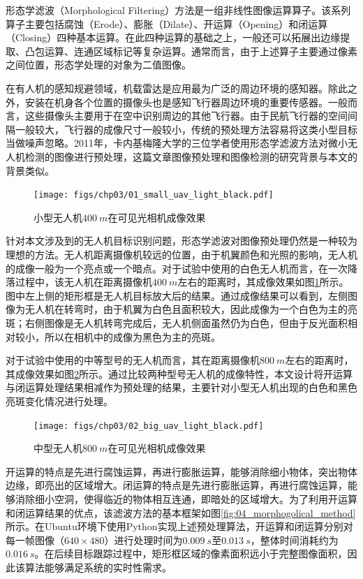形态学滤波（Morphological Filtering）方法是一组非线性图像运算算子。该系列算子主要包括腐蚀（Erode）、膨胀（Dilate）、开运算（Opening）和闭运算（Closing）四种基本运算。在此四种运算的基础之上，一般还可以拓展出边缘提取、凸包运算、连通区域标记等复杂运算。通常而言，由于上述算子主要通过像素之间位置，形态学处理的对象为二值图像。

在有人机的感知规避领域，机载雷达是应用最为广泛的周边环境的感知器。除此之外，安装在机身各个位置的摄像头也是感知飞行器周边环境的重要传感器。一般而言，这些摄像头主要用于在空中识别周边的其他飞行器。由于民航飞行器的空间间隔一般较大，飞行器的成像尺寸一般较小，传统的预处理方法容易将这类小型目标当做噪声忽略。2011年，卡内基梅隆大学的三位学者使用形态学滤波方法对微小无人机检测的图像进行预处理\cite{dey2011cascaded}，这篇文章图像预处理和图像检测的研究背景与本文的背景类似。
\begin{figure}[ht]   
	\centering
	\texttt{[image: figs/chp03/01\_small\_uav\_light\_black.pdf]}
	\caption{小型无人机$400\ m$在可见光相机成像效果}
	\label{fig:01_small_uav_light_black}
\end{figure}

针对本文涉及到的无人机目标识别问题，形态学滤波对图像预处理仍然是一种较为理想的方法。无人机距离摄像机较远的位置，由于机翼颜色和光照的影响，无人机的成像一般为一个亮点或一个暗点。对于试验中使用的白色无人机而言，在一次降落过程中，该无人机在距离摄像机$400\ m$左右的距离时，其成像效果如图\ref{fig:01_small_uav_light_black}所示。图中左上侧的矩形框是无人机目标放大后的结果。通过成像结果可以看到，左侧图像为无人机在转弯时，由于机翼为白色且面积较大，因此成像为一个白色为主的亮斑；右侧图像是无人机转弯完成后，无人机侧面虽然仍为白色，但由于反光面积相对较小，所以在相机中的成像为黑色为主的亮斑。


对于试验中使用的中等型号的无人机而言，其在距离摄像机$800\ m$左右的距离时，其成像效果如图\ref{fig:02_big_uav_light_black}所示。通过比较两种型号无人机的成像特性，本文设计将开运算与闭运算处理结果相减作为预处理的结果，主要针对小型无人机出现的白色和黑色亮斑变化情况进行处理。

\begin{figure}[ht]   
	\centering
	\texttt{[image: figs/chp03/02\_big\_uav\_light\_black.pdf]}
	\caption{中型无人机$800\ m$在可见光相机成像效果}
	\label{fig:02_big_uav_light_black}
\end{figure}

开运算的特点是先进行腐蚀运算，再进行膨胀运算，能够消除细小物体，突出物体边缘，即亮出的区域增大。闭运算的特点是先进行膨胀运算，再进行腐蚀运算，能够消除细小空洞，使得临近的物体相互连通，即暗处的区域增大。为了利用开运算和闭运算结果的优点，该滤波方法的基本框架如图\ref{fig:04_morphogolical_method}所示。在Ubuntu环境下使用Python实现上述预处理算法，开运算和闭运算分别对每一帧图像（$640 \times 480$）进行处理时间为$0.009\ s$至$0.013\ s$，整体时间消耗约为$0.016\ s$。在后续目标跟踪过程中，矩形框区域的像素面积远小于完整图像面积，因此该算法能够满足系统的实时性需求。


